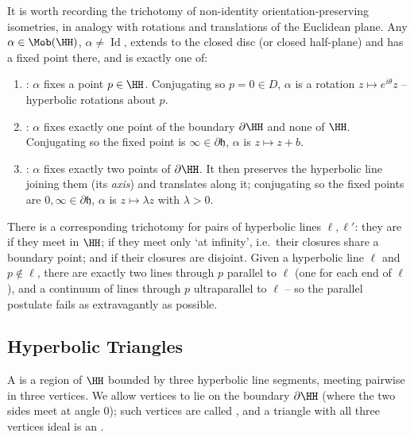 It is worth recording the trichotomy of non-identity orientation-preserving isometries, in analogy with rotations and translations of the Euclidean plane. Any $\alpha \in \Mob(\HH)$, $\alpha \neq \operatorname{Id}$, extends to the closed disc (or closed half-plane) and has a fixed point there, and is exactly one of:
\begin{enumerate}[label=(\roman*)]
    \item {}: $\alpha$ fixes a point $p \in \HH$. Conjugating so $p = 0 \in D$, $\alpha$ is a rotation $z \mapsto e^{i\theta}z$ -- hyperbolic rotations about $p$.
    \item {}: $\alpha$ fixes exactly one point of the boundary $\partial \HH$ and none of $\HH$. Conjugating so the fixed point is $\infty \in \partial\mathfrak{h}$, $\alpha$ is $z \mapsto z + b$.
    \item {}: $\alpha$ fixes exactly two points of $\partial\HH$. It then preserves the hyperbolic line joining them (its \emph{axis}) and translates along it; conjugating so the fixed points are $0, \infty \in \partial\mathfrak{h}$, $\alpha$ is $z \mapsto \lambda z$ with $\lambda > 0$.
\end{enumerate}

There is a corresponding trichotomy for pairs of hyperbolic lines $\ell, \ell'$: they are  if they meet in $\HH$;  if they meet only `at infinity', i.e.\ their closures share a boundary point; and  if their closures are disjoint. Given a hyperbolic line $\ell$ and $p \notin \ell$, there are exactly two lines through $p$ parallel to $\ell$ (one for each end of $\ell$), and a continuum of lines through $p$ ultraparallel to $\ell$ -- so the parallel postulate fails as extravagantly as possible.

\subsection{Hyperbolic Triangles}

\begin{definition}
    A  is a region of $\HH$ bounded by three hyperbolic line segments, meeting pairwise in three vertices. We allow vertices to lie on the boundary $\partial\HH$ (where the two sides meet at angle $0$); such vertices are called , and a triangle with all three vertices ideal is an .
\end{definition}


